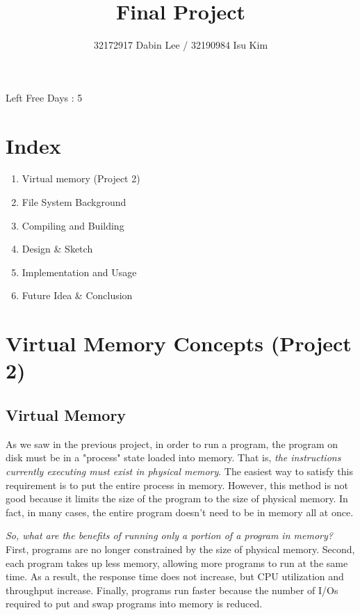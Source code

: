 \documentclass{homework}
\begin{document}
\title{Final Project}
\author{32172917 Dabin Lee / 32190984 Isu Kim}
\maketitle

\newenvironment{code}{\captionsetup{type=listing}}{}

\maketitle
\begin{center}
Left Free Days : 5
\end{center}
\pagebreak

\section{Index}
\begin{enumerate}
   \item Virtual memory (Project 2)
   \item File System Background
   \item Compiling and Building
   \item Design \& Sketch
   \item Implementation and Usage
   \item Future Idea \& Conclusion
\end{enumerate}
\pagebreak

\setcounter{section}{0}
\section{Virtual Memory Concepts (Project 2)}
\subsection{Virtual Memory}
As we saw in the previous project, in order to run a program, the program on disk must be in a "process" state loaded into memory. That is, \textit{the instructions currently executing must exist in physical memory}. The easiest way to satisfy this requirement is to put the entire process in memory. However, this method is not good because it limits the size of the program to the size of physical memory. In fact, in many cases, the entire program doesn't need to be in memory all at once.

\textit{So, what are the benefits of running only a portion of a program in memory?} First, programs are no longer constrained by the size of physical memory. Second, each program takes up less memory, allowing more programs to run at the same time. As a result, the response time does not increase, but CPU utilization and throughput increase. Finally, programs run faster because the number of I/Os required to put and swap programs into memory is reduced.
\end{document}
